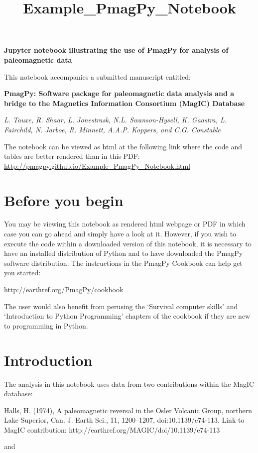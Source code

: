 \documentclass{article}
\title{Example\_PmagPy\_Notebook}
\begin{document}
    
   {\textbf{\LARGE{Jupyter notebook illustrating the use of PmagPy for analysis of
paleomagnetic
data}\label{jupyter-notebook-illustrating-the-use-of-pmagpy-for-analysis-of-paleomagnetic-data}}}

This notebook accompanies a submitted manuscript entitled:

\textbf{PmagPy: Software package for paleomagnetic data analysis and a
bridge to the Magnetics Information Consortium (MagIC) Database}

\textit{L. Tauxe, R. Shaar, L. Jonestrask, N.L. Swanson-Hysell, K.
Gaastra, L. Fairchild, N. Jarboe, R. Minnett, A.A.P. Koppers, and C.G.
Constable}

The notebook can be viewed as html at the following link where the code and tables are better rendered than in this PDF: \url{http://pmagpy.github.io/Example_PmagPy_Notebook.html}

\section{Before you begin}\label{before-you-begin}

You may be viewing this notebook as rendered html webpage or PDF in which case
you can go ahead and simply have a look at it. However, if you wish to
execute the code within a downloaded version of this notebook, it is
necessary to have an installed distribution of Python and to have
downloaded the PmagPy software distribution. The instructions in the
PmagPy Cookbook can help get you started:

http://earthref.org/PmagPy/cookbook

The user would also benefit from perusing the `Survival computer skills'
and `Introduction to Python Programming' chapters of the cookbook if
they are new to programming in Python.

\section{Introduction}\label{introduction}

The analysis in this notebook uses data from two contributions within
the MagIC database:

Halls, H. (1974), A paleomagnetic reversal in the Osler Volcanic Group,
northern Lake Superior, Can. J. Earth Sci., 11, 1200--1207,
doi:10.1139/e74-113. Link to MagIC contribution:
http://earthref.org/MAGIC/doi/10.1139/e74-113

and
\end{document}
